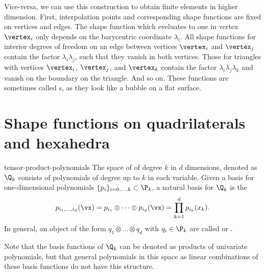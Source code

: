 \begin{remark}
  Vice-versa, we can use this construction to obtain finite elements
  in higher dimension. First, interpolation points and corresponding
  shape functions are fixed on vertices and edges. The shape function
  which eveluates to one in vertex $\vertex_i$ only depends on the
  barycentric coordinate $\lambda_i$. All shape functions for interior
  degrees of freedom on an edge between vertices $\vertex_i$ and
  $\vertex_j$ contain the factor $\lambda_i\lambda_j$, such that they
  vanish in both vertices. Those for triangles with vertices
  $\vertex_i$, $\vertex_j$, and $\vertex_k$ contain the factor
  $\lambda_i\lambda_j\lambda_k$ and vanish on the boundary on the
  triangle. And so on. These functions are sometimes called
  s, as they look like a bubble on a flat
  surface.
\end{remark}


\section{Shape functions on quadrilaterals and hexahedra}

\begin{Definition}{tensor-product-polynomials}
  The space of  of degree $k$ in
  $d$ dimensions, denoted as $\Q_k$ consists of polynomials of degree
  up to $k$ in each variable. Given a basis for one-dimensional
  polynomials $\{p_i\}_{i=0,\dots,k}\subset \P_k$, a natural basis for $\Q_k$ is
  the 
  \begin{gather}
    \label{eq:fem-intro:1}
    p_{i_1,\dots,i_d}(\vx)
    = p_{i_1}\otimes \dots\otimes p_{i_d}(\vx)
    = \prod_{k=1}^d p_{i_k}(x_k).
  \end{gather}
  In general, an object of the form $q_1\otimes \dots\otimes q_d$ with
  $q_i\in\P_k$ are called  or .
\end{Definition}

\begin{remark}
  Note that the basis functions of $\Q_k$ can be denoted as products
  of univariate polynomials, but that general polynomials in this
  space as linear combinations of these basis functions do not have
  this structure.
\end{remark}

